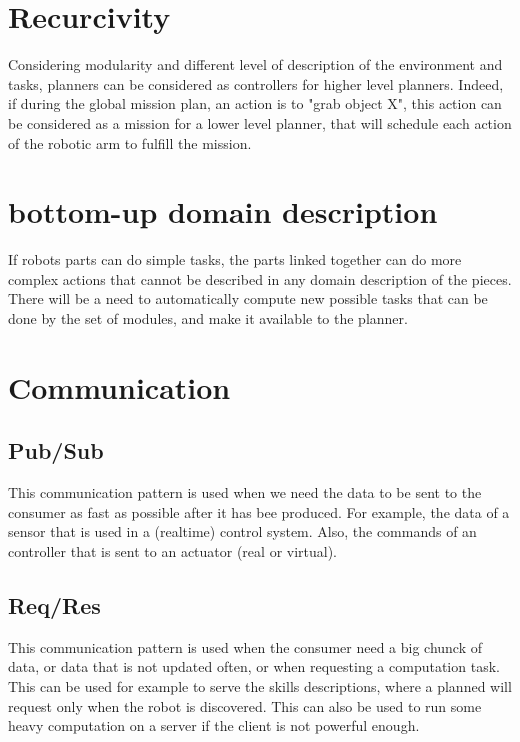 \documentclass[conference]{IEEEtran}
\begin{document}
\section{Recurcivity}

Considering modularity and different level of description of the environment and tasks, planners can be considered as controllers for higher level planners.
Indeed, if during the global mission plan, an action is to "grab object X", this action can be considered as a mission for a lower level planner, that will schedule each action of the robotic arm to fulfill the mission.

\section{bottom-up domain description}

If robots parts can do simple tasks, the parts linked together can do more complex actions that cannot be described in any domain description of the pieces.
There will be a need to automatically compute new possible tasks that can be done by the set of modules, and make it available to the planner.

\section{Communication}

\subsection{Pub/Sub}

This communication pattern is used when we need the data to be sent to the consumer as fast as possible after it has bee produced.
For example, the data of a sensor that is used in a (realtime) control system.
Also, the commands of an controller that is sent to an actuator (real or virtual).

\subsection{Req/Res}

This communication pattern is used when the consumer need a big chunck of data, or data that is not updated often, or when requesting a computation task.
This can be used for example to serve the skills descriptions, where a planned will request only when the robot is discovered.
This can also be used to run some heavy computation on a server if the client is not powerful enough.

\end{document}
